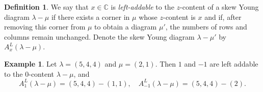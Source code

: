 \documentclass[11pt]{amsart}
\numberwithin{equation}{section}
\theoremstyle{definition}
\newtheorem{definition}[thm]{Definition}
\newtheorem{example}[thm]{Example}
\begin{document}










\begin{definition}  \label{def left addable} 
 We say that $x \in \mathbb C$ is {\it left-addable} to the $z$-content of a skew Young diagram $\lambda-\mu$ if there exists a corner in $\mu$ whose $z$-content is $x$ and if, after removing this corner from \(\mu\) to obtain a diagram \(\mu'\), the numbers of rows and columns remain unchanged.  Denote  the skew Young diagram $\lambda-\mu'$ by $A^L_x(\lambda-\mu)$. 
\end{definition}

\begin{example}
Let $\lambda=(5,4,4)$ and $\mu=(2,1)$. Then $1$ and $-1$ are left addable to the $0$-content $\lambda-\mu$, and
\[   A^L_{1}(\lambda-\mu) = (5,4,4)-(1,1), \quad A^L_{-1}(\lambda-\mu) =(5,4,4)-(2) .\]
\end{example}
\end{document}
